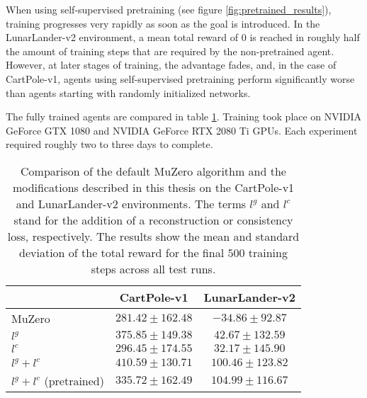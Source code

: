 When using self-supervised pretraining (see figure \ref{fig:pretrained_results}), training progresses very rapidly as soon as the goal is introduced. In the LunarLander-v2 environment, a mean total reward of $0$ is reached in roughly half the amount of training steps that are required by the non-pretrained agent. However, at later stages of training, the advantage fades, and, in the case of CartPole-v1, agents using self-supervised pretraining perform significantly worse than agents starting with randomly initialized networks.

The fully trained agents are compared in table \ref{tab:results_table}. Training took place on NVIDIA GeForce GTX 1080 and NVIDIA GeForce RTX 2080 Ti GPUs. Each experiment required roughly two to three days to complete.
\begin{table}[ht]
    \centering
    \begin{tabular}{|l||c|c|}
        \hline
        & CartPole-v1 & LunarLander-v2 \\
        \hline \hline
        MuZero & $281.42 \pm 162.48$ & $-34.86 \pm 92.87$ \\
        \hline
        $l^g$ & $375.85 \pm 149.38$ & $42.67 \pm 132.59$\\
        \hline
        $l^c$ & $296.45 \pm 174.55$ & $32.17 \pm 145.90$ \\
        \hline
        $l^g + l^c$ & $\mathbf{410.59 \pm 130.71}$ & $100.46 \pm 123.82$ \\
        \hline
        $l^g + l^c$ (pretrained) & $335.72 \pm 162.49$ & $\mathbf{104.99 \pm 116.67}$ \\
        \hline
    \end{tabular}
    \caption{Comparison of the default MuZero algorithm and the modifications described in this thesis on the CartPole-v1 and LunarLander-v2 environments. The terms $l^g$ and $l^c$ stand for the addition of a reconstruction or consistency loss, respectively. The results show the mean and standard deviation of the total reward for the final $500$ training steps across all test runs.}
    \label{tab:results_table}
\end{table}